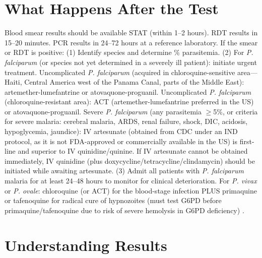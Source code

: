 \section*{What Happens After the Test}
Blood smear results should be available STAT (within 1--2 hours). RDT results in 15--20 minutes. PCR results in 24--72 hours at a reference laboratory. If the smear or RDT is positive: (1) Identify species and determine \% parasitemia. (2) For \textit{P. falciparum} (or species not yet determined in a severely ill patient): initiate urgent treatment. Uncomplicated \textit{P. falciparum} (acquired in chloroquine-sensitive area---Haiti, Central America west of the Panama Canal, parts of the Middle East): artemether-lumefantrine or atovaquone-proguanil. Uncomplicated \textit{P. falciparum} (chloroquine-resistant area): ACT (artemether-lumefantrine preferred in the US) or atovaquone-proguanil. Severe \textit{P. falciparum} (any parasitemia $\geq$5\%, or criteria for severe malaria: cerebral malaria, ARDS, renal failure, shock, DIC, acidosis, hypoglycemia, jaundice): IV artesunate (obtained from CDC under an IND protocol, as it is not FDA-approved or commercially available in the US) is first-line and superior to IV quinidine/quinine. If IV artesunate cannot be obtained immediately, IV quinidine (plus doxycycline/tetracycline/clindamycin) should be initiated while awaiting artesunate. (3) Admit all patients with \textit{P. falciparum} malaria for at least 24--48 hours to monitor for clinical deterioration. For \textit{P. vivax} or \textit{P. ovale}: chloroquine (or ACT) for the blood-stage infection PLUS primaquine or tafenoquine for radical cure of hypnozoites (must test G6PD before primaquine/tafenoquine due to risk of severe hemolysis in G6PD deficiency) \cite{cdc2023treatment}.

\section*{Understanding Results}

